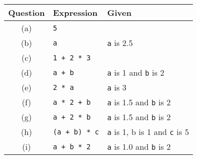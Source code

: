 \begin{enumerate}
  \begin{table}[h]
    \centering
    \begin{tabular}{|c|l|l|}
      \hline
      \textbf{Question} & \textbf{Expression} & \textbf{Given} \\
      \hline
      (a) & \texttt{5} & \\
      \hline
      (b) & \texttt{a} & \texttt{a} is 2.5 \\
      \hline
      (c) & \texttt{1 + 2 * 3} & \\
      \hline
      (d) & \texttt{a + b} & \texttt{a} is 1 and \texttt{b} is 2 \\
      \hline
      (e) & \texttt{2 * a} & \texttt{a} is 3 \\
      \hline
      (f) & \texttt{a * 2 + b} & \texttt{a} is 1.5 and \texttt{b} is 2\\
      \hline
      (g) & \texttt{a + 2 * b} & \texttt{a} is 1.5 and \texttt{b} is 2 \\
      \hline
      (h) & \texttt{(a + b) * c} & \texttt{a} is 1, b is 1 and \texttt{c} is 5 \\
      \hline
      (i) & \texttt{a + b * 2} & \texttt{a} is 1.0 and \texttt{b} is 2\\
      \hline
    \end{tabular}    
  \end{table}
\end{enumerate}


